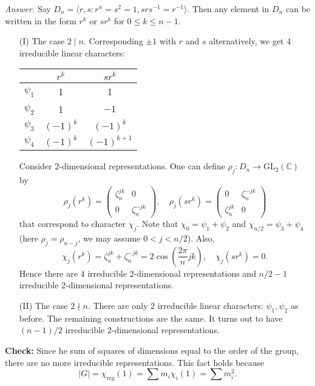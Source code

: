\documentclass{mathproblems}
\newcommand\C{\mathbb{C}}
\newcommand\GL{\mathrm{GL}}
\begin{document}
\begin{questions}
\textit{Answer.} Say $D_n=\langle r,s: r^n=s^2=1, s r s^{-1}=r^{-1}\rangle$. Then any element in $D_n$ can be written in the form $r^k$ or $s r^k$ for $0\leqslant k\leqslant n-1$. \begin{itemize}
\item[(I)] The case $2\mid n$. Corresponding $\pm 1$ with $r$ and $s$ alternatively, we get 4 irreducible linear characters:
\begin{center}
\begin{tabular}{c|cc} 
& $r^{k}$ & $s r^{k}$ \\
\hline$\psi_{1}$ & 1 & 1 \\
$\psi_{2}$ & 1 & $-1$ \\
$\psi_{3}$ & $(-1)^{k}$ & $(-1)^{k}$ \\
$\psi_{4}$ & $(-1)^{k}$ & $(-1)^{k+1}$
\end{tabular}
\end{center}
Consider 2-dimensional representations. One can define $\rho_j:D_n\to \GL_2(\C)$ by
$$
\rho_j(r^k)=\begin{pmatrix}
\zeta_n^{jk} & 0 \\ 0 & \zeta_n^{-jk}
\end{pmatrix},\quad \rho_j(s r^k)=\begin{pmatrix}
0 & \zeta_n^{-jk} \\ \zeta_n^{jk} & 0
\end{pmatrix}
$$
that correspond to character $\chi_j$. Note that $\chi_0=\psi_1+\psi_2$ and $\chi_{n/2}=\psi_3+\psi_4$ (here $\rho_j=\rho_{n-j}$, we may assume $0<j<n/2$). Also,
$$
\chi_j(r^k)=\zeta_n^{jk}+\zeta_n^{-jk}=2\cos (\frac{2\pi}{n}j k),\quad \chi_j(sr^k)=0.
$$
Hence there are 4 irreducible 2-dimensional representations and $n/2-1$ irreducible 2-dimensional representations.

\item[(II)] The case $2\nmid n$. There are only 2 irreducible linear characters: $\psi_1,\psi_2$ as before. The remaining constructions are the same. It turns out to have $(n-1)/2$ irreducible 2-dimensional representations.
\end{itemize}
\textbf{Check:} Since he sum of squares of dimensions equal to the order of the
group, there are no more irreducible representations. This fact holds because
$$
|G|=\chi_{\operatorname{reg}}(1)=\sum m_i \chi_i(1)=\sum m_i^2.
$$



\end{questions}
\end{document}
